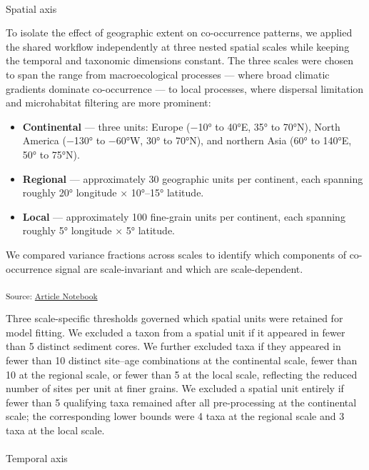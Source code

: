 \documentclass[
  12pt,
]{article}
\makeatletter
\let\oldparagraph\paragraph
\renewcommand{\paragraph}{
    \@ifstar
      \xxxParagraphStar
      \xxxParagraphNoStar
  }
\newcommand{\xxxParagraphStar}[1]{\oldparagraph*{#1}\mbox{}}
\newcommand{\xxxParagraphNoStar}[1]{\oldparagraph{#1}\mbox{}}
\providecommand{\tightlist}{%
  \setlength{\itemsep}{0pt}\setlength{\parskip}{0pt}}
\makeatother
\begin{document}
\paragraph{Spatial axis}\label{spatial-axis}

To isolate the effect of geographic extent on co-occurrence patterns, we
applied the shared workflow independently at three nested spatial scales
while keeping the temporal and taxonomic dimensions constant. The three
scales were chosen to span the range from macroecological processes ---
where broad climatic gradients dominate co-occurrence --- to local
processes, where dispersal limitation and microhabitat filtering are
more prominent:

\begin{itemize}
\tightlist
\item
  \textbf{Continental} --- three units: Europe (−10° to 40°E, 35° to
  70°N), North America (−130° to −60°W, 30° to 70°N), and northern Asia
  (60° to 140°E, 50° to 75°N).
\item
  \textbf{Regional} --- approximately 30 geographic units per continent,
  each spanning roughly 20° longitude × 10°--15° latitude.
\item
  \textbf{Local} --- approximately 100 fine-grain units per continent,
  each spanning roughly 5° longitude × 5° latitude.
\end{itemize}

We compared variance fractions across scales to identify which
components of co-occurrence signal are scale-invariant and which are
scale-dependent.

\textsubscript{Source:
\href{https://OndrejMottl.github.io/BIODYNAMICS-vegetation-cooccurrence/manuscript.qmd.html}{Article
Notebook}}

Three scale-specific thresholds governed which spatial units were
retained for model fitting. We excluded a taxon from a spatial unit if
it appeared in fewer than 5 distinct sediment cores. We further excluded
taxa if they appeared in fewer than 10 distinct site--age combinations
at the continental scale, fewer than 10 at the regional scale, or fewer
than 5 at the local scale, reflecting the reduced number of sites per
unit at finer grains. We excluded a spatial unit entirely if fewer than
5 qualifying taxa remained after all pre-processing at the continental
scale; the corresponding lower bounds were 4 taxa at the regional scale
and 3 taxa at the local scale.

\paragraph{Temporal axis}\label{temporal-axis}
\end{document}
